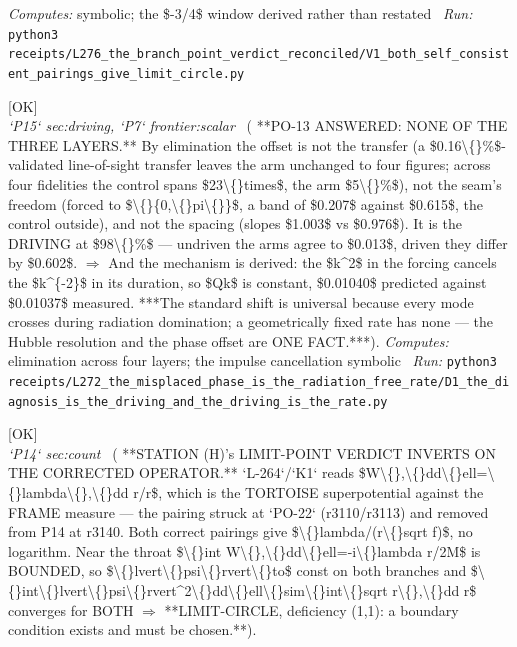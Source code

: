 \begin{description}
\emph{Computes:} symbolic; the \$-3/4\$ window derived rather than restated
\ \emph{Run:} \texttt{python3 receipts/L276\_the\_branch\_point\_verdict\_reconciled/V1\_both\_self\_consistent\_pairings\_give\_limit\_circle.py}
\item[\label{rcpt:D1_the_diagnosis_is_the_driving_and_the_driving_is_the_rate}\texttt{D1\_the\_diagnosis\_is\_the\_driving\_and\_the\_driving\_is\_the\_rate}]\hfill\textsf{[OK]}\\
\textit{`P15` sec:driving, `P7` frontier:scalar} \ ( **PO-13 ANSWERED: NONE OF THE THREE LAYERS.** By elimination the offset is not the transfer (a \$0.16\textbackslash\{\}\%\$-validated line-of-sight transfer leaves the arm unchanged to four figures; across four fidelities the control spans \$23\textbackslash\{\}times\$, the arm \$5\textbackslash\{\}\%\$), not the seam's freedom (forced to \$\textbackslash\{\}\{0,\textbackslash\{\}pi\textbackslash\{\}\}\$, a band of \$0.207\$ against \$0.615\$, the control outside), and not the spacing (slopes \$1.003\$ vs \$0.976\$). It is the DRIVING at \$98\textbackslash\{\}\%\$ --- undriven the arms agree to \$0.013\$, driven they differ by \$0.602\$. \ensuremath{\Rightarrow} And the mechanism is derived: the \$k\textasciicircum{}2\$ in the forcing cancels the \$k\textasciicircum{}\{-2\}\$ in its duration, so \$Qk\$ is constant, \$0.01040\$ predicted against \$0.01037\$ measured. ***The standard shift is universal because every mode crosses during radiation domination; a geometrically fixed rate has none --- the Hubble resolution and the phase offset are ONE FACT.***). 
\emph{Computes:} elimination across four layers; the impulse cancellation symbolic
\ \emph{Run:} \texttt{python3 receipts/L272\_the\_misplaced\_phase\_is\_the\_radiation\_free\_rate/D1\_the\_diagnosis\_is\_the\_driving\_and\_the\_driving\_is\_the\_rate.py}
\item[\label{rcpt:L1_the_limit_point_verdict_inverts_on_the_corrected_operator}\texttt{L1\_the\_limit\_point\_verdict\_inverts\_on\_the\_corrected\_operator}]\hfill\textsf{[OK]}\\
\textit{`P14` sec:count} \ ( **STATION (H)'s LIMIT-POINT VERDICT INVERTS ON THE CORRECTED OPERATOR.** `L-264`/`K1` reads \$W\textbackslash\{\},\textbackslash\{\}dd\textbackslash\{\}ell=\textbackslash\{\}lambda\textbackslash\{\},\textbackslash\{\}dd r/r\$, which is the TORTOISE superpotential against the FRAME measure --- the pairing struck at `PO-22` (r3110/r3113) and removed from P14 at r3140. Both correct pairings give \$\textbackslash\{\}lambda/(r\textbackslash\{\}sqrt f)\$, no logarithm. Near the throat \$\textbackslash\{\}int W\textbackslash\{\},\textbackslash\{\}dd\textbackslash\{\}ell=-i\textbackslash\{\}lambda r/2M\$ is BOUNDED, so \$\textbackslash\{\}lvert\textbackslash\{\}psi\textbackslash\{\}rvert\textbackslash\{\}to\$ const on both branches and \$\textbackslash\{\}int\textbackslash\{\}lvert\textbackslash\{\}psi\textbackslash\{\}rvert\textasciicircum{}2\textbackslash\{\}dd\textbackslash\{\}ell\textbackslash\{\}sim\textbackslash\{\}int\textbackslash\{\}sqrt r\textbackslash\{\},\textbackslash\{\}dd r\$ converges for BOTH \ensuremath{\Rightarrow} **LIMIT-CIRCLE, deficiency (1,1): a boundary condition exists and must be chosen.**). 

\end{description}
